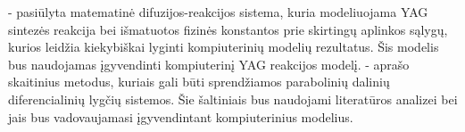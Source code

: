 \documentclass[]{VUMIFTemplateClass}
\begin{document}
\cite{ivanauskasComputationalModellingYAG2009,ivanauskasModellingSolidState2005,mackeviciusCloserLookComputer2012} - pasiūlyta matematinė difuzijos-reakcijos sistema, kuria modeliuojama YAG sintezės reakcija bei išmatuotos fizinės konstantos prie skirtingų aplinkos sąlygų, kurios leidžia kiekybiškai lyginti kompiuterinių modelių rezultatus. Šis modelis bus naudojamas įgyvendinti kompiuterinį YAG reakcijos modelį. \cite{pressNumericalRecipes3rd2007,levequeFiniteDifferenceMethods2007} - aprašo skaitinius metodus, kuriais gali būti sprendžiamos parabolinių dalinių diferencialinių lygčių sistemos. Šie šaltiniais bus naudojami literatūros analizei bei jais bus vadovaujamasi įgyvendintant kompiuterinius modelius.

\printbibliography[title = {Literatūra ir šaltiniai}]
\end{document}
